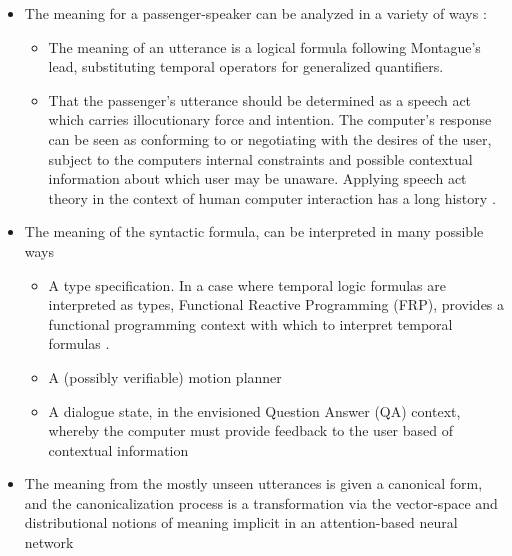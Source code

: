 \documentclass[a4paper, 11pt]{article}
\begin{document}
\begin{itemize}
\item The meaning for a passenger-speaker can be analyzed in a variety of ways :
  \begin{itemize}
    \item The meaning of an utterance is a logical formula following Montague's
    lead, substituting temporal operators for generalized quantifiers.
    \item That the passenger's utterance should be determined as a speech act
      which carries illocutionary force and intention. The computer's
      response can be seen as conforming to or negotiating with the desires of
      the user, subject to the computers internal constraints and possible
      contextual information about which user may be unaware. Applying speech
      act theory in the context of human computer interaction has a long history
      \cite{winograd}.
  \end{itemize}
\item The meaning of the syntactic formula, can be interpreted in many possible ways
  \begin{itemize}
    \item A type specification. In a case where
      temporal logic formulas are interpreted as types, Functional Reactive
      Programming (FRP), provides a functional programming context with which to
      interpret temporal formulas
      \cite{hudak}.
    \item A (possibly verifiable) motion planner  \cite{verifiedMotion} \cite{7759412} \cite{kuo2020deep}
    \item A dialogue state, in the envisioned Question Answer (QA) context, whereby
      the computer must provide feedback to the user based of contextual information
  \end{itemize}
\item The meaning from the mostly unseen utterances is given a canonical form,
  and the canonicalization process is a transformation via the vector-space and
  distributional notions of meaning implicit in an attention-based neural network 
\end{itemize}
\end{document}
